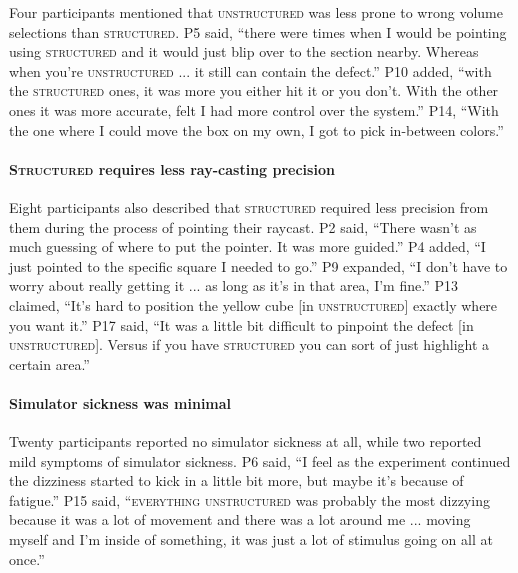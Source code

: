 Four participants mentioned that \textsc{unstructured} was less prone to wrong volume selections than \textsc{structured}. P5 said, ``there were times when I would be pointing using \textsc{structured} and it would just blip over to the section nearby. Whereas when you're \textsc{unstructured} ... it still can contain the defect.'' P10 added, ``with the \textsc{structured} ones, it was more you either hit it or you don't. With the other ones it was more accurate, felt I had more control over the system.'' P14, ``With the one where I could move the box on my own, I got to pick in-between colors.''

\paragraph{\textbf{\textsc{Structured} requires less ray-casting precision}}
Eight participants also described that \textsc{structured} required less precision from them during the process of pointing their raycast. P2 said, ``There wasn't as much guessing of where to put the pointer. It was more guided.'' P4 added, ``I just pointed to the specific square I needed to go.'' P9 expanded, ``I don't have to worry about really getting it ... as long as it's in that area, I'm fine.'' P13 claimed, ``It's hard to position the yellow cube [in \textsc{unstructured}] exactly where you want it.'' P17 said, ``It was a little bit difficult to pinpoint the defect [in \textsc{unstructured}]. Versus if you have \textsc{structured} you can sort of just highlight a certain area.''

\paragraph{\textbf{Simulator sickness was minimal}}
Twenty participants reported no simulator sickness at all, while two reported mild symptoms of simulator sickness. P6 said, ``I feel as the experiment continued the dizziness started to kick in a little bit more, but maybe it's because of fatigue.'' P15 said, ``\textsc{everything unstructured} was probably the most dizzying because it was a lot of movement and there was a lot around me ... moving myself and I'm inside of something, it was just a lot of stimulus going on all at once.''
